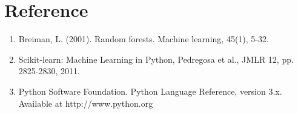 \documentclass[a4paper,12pt]{article}
\begin{document}
\section{Reference}
\label{sec:references}

\begin{enumerate}
    \item Breiman, L. (2001). Random forests. Machine learning, 45(1), 5-32.
    \item Scikit-learn: Machine Learning in Python, Pedregosa et al., JMLR 12, pp. 2825-2830, 2011.
    \item Python Software Foundation. Python Language Reference, version 3.x. Available at http://www.python.org
\end{enumerate}
\end{document}
